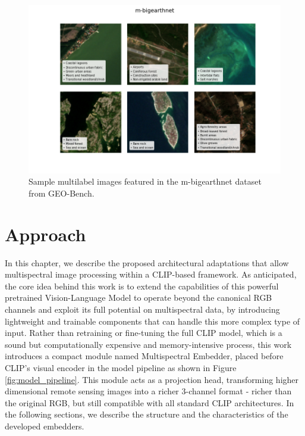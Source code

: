 \documentclass[a4paper, twoside, english]{sapthesis} %
\begin{document}
\begin{figure}[h]
    \centering
    \includegraphics[width=\textwidth]{img/m-bigearthnet_image_grid.png}
    \caption{\normalsize Sample multilabel images featured in the m-bigearthnet dataset from GEO-Bench.}
    \label{fig:bengrid}
\end{figure}


\chapter{Approach} %

In this chapter, we describe the proposed architectural adaptations that allow multispectral image processing within a CLIP-based framework. As anticipated, the core idea behind this work is to extend the capabilities of this powerful pretrained Vision-Language Model to operate beyond the canonical RGB channels and exploit its full potential on multispectral data, by introducing lightweight and trainable components that can handle this more complex type of input.
Rather than retraining or fine-tuning the full CLIP model, which is a sound but computationally expensive and memory-intensive process, this work introduces a compact module named Multispectral Embedder, placed before CLIP's visual encoder in the model pipeline as shown in Figure \ref{fig:model_pipeline}. This module acts as a projection head, transforming higher dimensional remote sensing images into a richer 3-channel format - richer than the original RGB, but still compatible with all standard CLIP architectures. In the following sections, we describe the structure and the characteristics of the developed embedders. 
\end{document}
